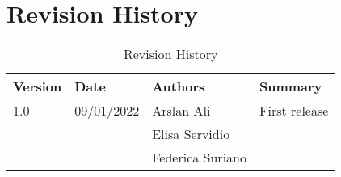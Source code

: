 \section{Revision History}
\begin{center}
\setlength\tabcolsep{7pt}
\renewcommand{\arraystretch}{1.5}
\begin{longtable}{|p{1.5cm}|p{1.7cm}|p{2.75cm}|p{2cm}|}
\caption{Revision History}\\
\hline
\endfirsthead
\endhead
\hline
\endlastfoot
\rowcolor{green2}
\textbf{Version} & \textbf{Date} & \textbf{Authors} & \textbf{Summary}\\
\hline
1.0 & 09/01/2022 & Arslan Ali &  First release\\
& & Elisa Servidio & \\
& & Federica Suriano &\\
\end{longtable}
\end{center}